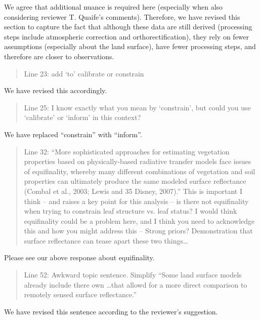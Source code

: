 We agree that additional nuance is required here (especially when also considering reviewer T. Quaife’s comments). Therefore, we have revised this section to capture the fact that although these data are still derived (processing steps include atmospheric correction and orthorectification), they rely on fewer assumptions (especially about the land surface), have fewer processing steps, and therefore are closer to observations.


\begin{quote}
  Line 23: add ‘to’ calibrate or constrain
\end{quote}

We have revised this accordingly.


\begin{quote}
  Line 25: I know exactly what you mean by ‘constrain’, but could you use ‘calibrate’ or ‘inform’ in this context?
\end{quote}

We have replaced “constrain” with “inform”.


\begin{quote}
  Line 32: “More sophisticated approaches for estimating vegetation properties based on physically-based radiative transfer models face issues of equifinality, whereby many different combinations of vegetation and soil properties can ultimately produce the same modeled surface reflectance (Combal et al., 2003; Lewis and 35 Disney, 2007).” This is important I think – and raises a key point for this analysis – is there not equifinality when trying to constrain leaf structure vs. leaf status? I would think equifinality could be a problem here, and I think you need to acknowledge this and how you might address this – Strong priors? Demonstration that surface reflectance can tease apart these two things\ldots
\end{quote}

Please see our above response about equifinality.


\begin{quote}
  Line 52: Awkward topic sentence. Simplify “Some land surface models already include there own \ldots that allowd for a more direct comparison to remotely sensed surface reflectance.”
\end{quote}

We have revised this sentence according to the reviewer’s suggestion.

